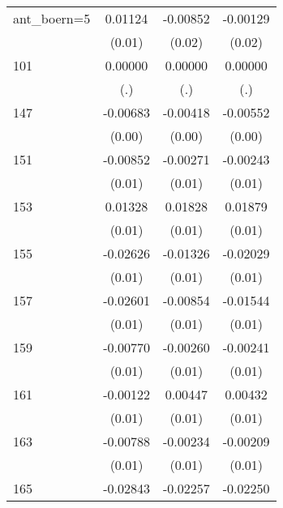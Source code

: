 \begin{table}[htbp]
\begin{tabular}{l*{3}{c}}
ant\_boern=5         &     0.01124         &    -0.00852         &    -0.00129         \\
                    &      (0.01)         &      (0.02)         &      (0.02)         \\
101                 &     0.00000         &     0.00000         &     0.00000         \\
                    &         (.)         &         (.)         &         (.)         \\
147                 &    -0.00683         &    -0.00418         &    -0.00552         \\
                    &      (0.00)         &      (0.00)         &      (0.00)         \\
151                 &    -0.00852         &    -0.00271         &    -0.00243         \\
                    &      (0.01)         &      (0.01)         &      (0.01)         \\
153                 &     0.01328         &     0.01828         &     0.01879         \\
                    &      (0.01)         &      (0.01)         &      (0.01)         \\
155                 &    -0.02626\sym{*}  &    -0.01326         &    -0.02029         \\
                    &      (0.01)         &      (0.01)         &      (0.01)         \\
157                 &    -0.02601\sym{***}&    -0.00854         &    -0.01544\sym{*}  \\
                    &      (0.01)         &      (0.01)         &      (0.01)         \\
159                 &    -0.00770         &    -0.00260         &    -0.00241         \\
                    &      (0.01)         &      (0.01)         &      (0.01)         \\
161                 &    -0.00122         &     0.00447         &     0.00432         \\
                    &      (0.01)         &      (0.01)         &      (0.01)         \\
163                 &    -0.00788         &    -0.00234         &    -0.00209         \\
                    &      (0.01)         &      (0.01)         &      (0.01)         \\
165                 &    -0.02843\sym{*}  &    -0.02257         &    -0.02250         \\

\end{tabular}
\end{table}
